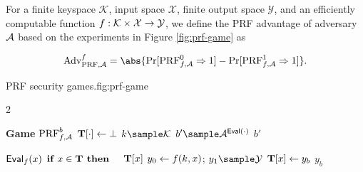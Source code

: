 \documentclass{article}
\begin{document}
\begin{definition}
    \label{def:prf}
    For a finite keyspace $\mathcal{K}$, input space $\mathcal{X}$, finite output space $\mathcal{Y}$, and an efficiently computable function $f: \mathcal{K} \times \mathcal{X} \rightarrow \mathcal{Y}$, we define the PRF advantage of adversary $\mathcal{A}$ based on the experiments in Figure \ref{fig:prf-game} as

    \[
        \advantage{\prf, \adversary{A}}{f} = \abs{\prone{\prf^0_{f, \adversary{A}}} - \prone{\prf^1_{f, \adversary{A}}}}.
    \]

\end{definition}

\begin{gamefigure}{PRF security games.}{fig:prf-game}
    \begin{games}{2}
        \begin{gameenv}{\textbf{Game} $\text{PRF}^b_{f, \mathcal{A}}$}
            \State $\mathbf{T}[\cdot] \leftarrow \bot$
            \State $k \sample \mathcal{K}$
            \State $b' \sample \adversary{A}^{\Eval(\cdot)}$
            \State \Return $b'$
        \end{gameenv}
        \gamebreak
        \begin{gameenv}{\oracle $\textsf{Eval}_{f}(x)$}
            \State $\textbf{if } x \in \mathbf{T} \textbf{ then}$
                \State $\quad $\Return $\mathbf{T}[x]$
                \State $y_0 \leftarrow f(k, x)$; $y_1 \sample \mathcal{Y}$
                \State $\mathbf{T}[x] \leftarrow y_b$
                \State \Return $y_b$
            \end{gameenv}
        \end{games}
    \end{gamefigure}




\end{document}
